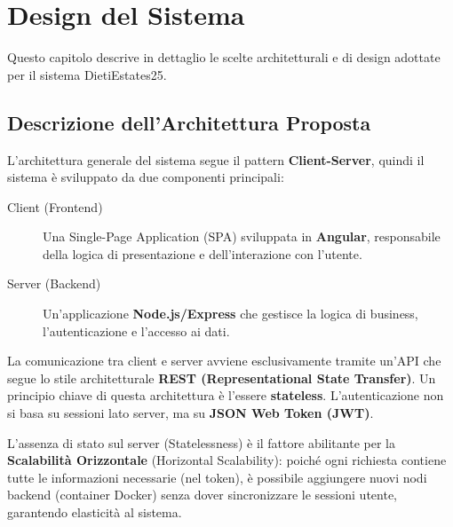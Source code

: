 \chapter{Design del Sistema}
\label{cap:design}

Questo capitolo descrive in dettaglio le scelte architetturali e di design adottate per il sistema DietiEstates25.

\section{Descrizione dell'Architettura Proposta}

L'architettura generale del sistema segue il pattern \textbf{Client-Server}, quindi il sistema è sviluppato da due componenti principali:

\begin{description}
    \item[Client (Frontend)] Una Single-Page Application (SPA) sviluppata in \textbf{Angular}, responsabile della logica di presentazione e dell'interazione con l'utente.
    \item[Server (Backend)] Un'applicazione \textbf{Node.js/Express} che gestisce la logica di business, l'autenticazione e l'accesso ai dati.
\end{description}

La comunicazione tra client e server avviene esclusivamente tramite un'API che segue lo stile architetturale \textbf{REST (Representational State Transfer)}. Un principio chiave di questa architettura è l'essere \textbf{stateless}. L'autenticazione non si basa su sessioni lato server, ma su \textbf{JSON Web Token (JWT)}. 

L'assenza di stato sul server (Statelessness) è il fattore abilitante per la \textbf{Scalabilità Orizzontale} (Horizontal Scalability): poiché ogni richiesta contiene tutte le informazioni necessarie (nel token), è possibile aggiungere nuovi nodi backend (container Docker) senza dover sincronizzare le sessioni utente, garantendo elasticità al sistema.

